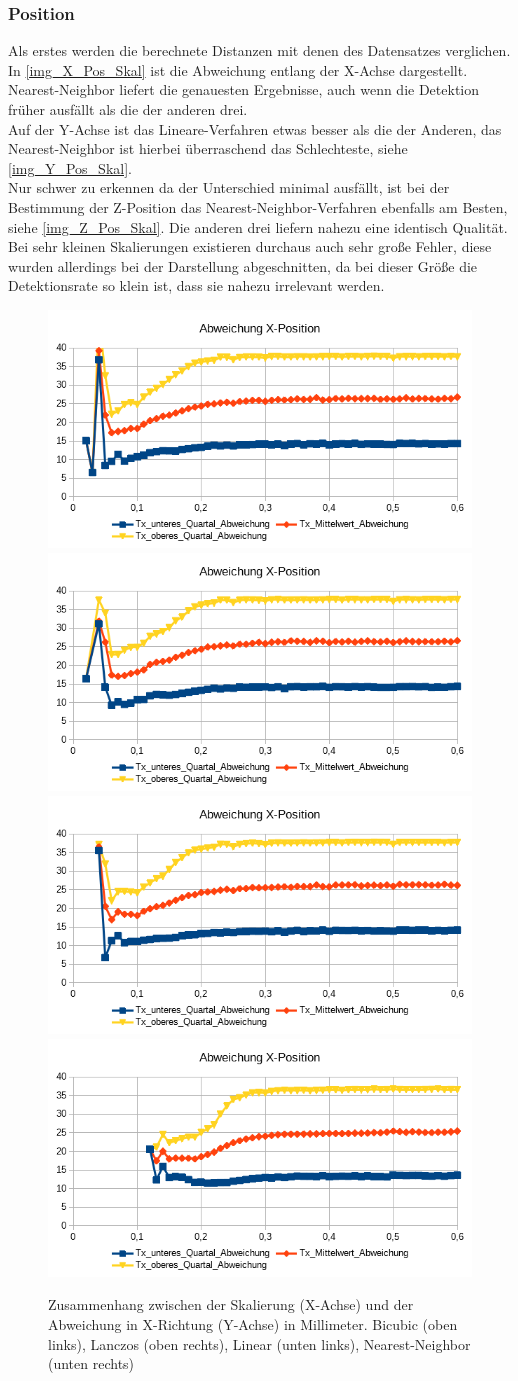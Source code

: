 \subsubsection{Position}
Als erstes werden die berechnete Distanzen mit denen des Datensatzes verglichen. In \autoref{img_X_Pos_Skal} ist die Abweichung entlang der X-Achse dargestellt. Nearest-Neighbor liefert die genauesten Ergebnisse, auch wenn die Detektion früher ausfällt als die der anderen drei.\\
Auf der Y-Achse ist das Lineare-Verfahren etwas besser als die der Anderen, das Nearest-Neighbor ist hierbei überraschend das Schlechteste, siehe \autoref{img_Y_Pos_Skal}.\\
Nur schwer zu erkennen da der Unterschied minimal ausfällt, ist bei der Bestimmung der Z-Position das Nearest-Neighbor-Verfahren ebenfalls am Besten, siehe \autoref{img_Z_Pos_Skal}. Die anderen drei liefern nahezu eine identisch Qualität. Bei sehr kleinen Skalierungen existieren durchaus auch sehr große Fehler, diese wurden allerdings bei der Darstellung abgeschnitten, da bei dieser Größe die Detektionsrate so klein ist, dass sie nahezu irrelevant werden.
\begin{figure}
	\centering
	\includegraphics[width=0.45\linewidth]{tabelle2/X_Pos_Cubic}
	\includegraphics[width=0.45\linewidth]{tabelle2/X_Pos_Lanc}
	\includegraphics[width=0.45\linewidth]{tabelle2/X_Pos_Linear}
	\includegraphics[width=0.45\linewidth]{tabelle2/X_Pos_NN}
	\caption{Zusammenhang zwischen der Skalierung (X-Achse) und der Abweichung in X-Richtung (Y-Achse) in Millimeter. 
		Bicubic (oben links), Lanczos (oben rechts), Linear (unten links), Nearest-Neighbor (unten rechts)}
	\label{img_X_Pos_Skal}
\end{figure}
